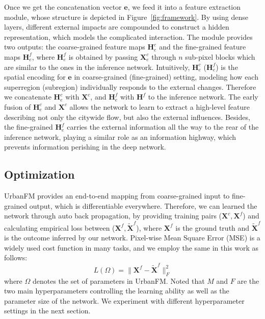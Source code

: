 Once we get the concatenation vector $\mathbf{e}$, we feed it into a feature extraction module, whose structure is depicted in Figure~\ref{fig:framework}. By using dense layers, different external impacts are compounded to construct a hidden representation, which models the complicated interaction. The module provides two outputs: the coarse-grained feature maps $\mathbf{H}^c_e$ and the fine-grained feature maps $\mathbf{H}^f_e$, where $\mathbf{H}^f_e$ is obtained by passing $\mathbf{X}^c_e$ through $n$ sub-pixel blocks which are similar to the ones in the inference network. Intuitively, $\mathbf{H}^c_e$ ($\mathbf{H}^f_e$) is the spatial encoding for $\mathbf{e}$ in coarse-grained (fine-grained) setting, modeling how each superregion (subregion) individually responds to the external changes. Therefore we concatenate $\mathbf{H}^c_e$ with $\mathbf{X}^c$, and $\mathbf{H}^f_e$ with $\mathbf{H}^f$ to the inference network. The early fusion of $\mathbf{H}^c_e$ and $\mathbf{X}^c$ allows the network to learn to extract a high-level feature describing not only the citywide flow, but also the external influences. Besides, the fine-grained $\mathbf{H}^f_e$ carries the external information all the way to the rear of the inference network, playing a similar role as an information highway, which prevents information perishing in the deep network.

\subsection{Optimization}
UrbanFM provides an end-to-end mapping from coarse-grained input to fine-grained output, which is differentiable everywhere. Therefore, we can learned the network through auto back propagation, by providing training pairs ($\mathbf{X}^c, \mathbf{X}^f$) and calculating empirical loss between ($\mathbf{X}^f,\tilde{\mathbf{X}}^f$), where $\mathbf{X}^f$ is the ground truth and $\tilde{\mathbf{X}}^f$ is the outcome inferred by our network. Pixel-wise Mean Square Error (MSE) is a widely used cost function in many tasks, and we employ the same in this work as follows:
\begin{equation}
L(\Omega)=\lVert{\mathbf{X}^f-\tilde{\mathbf{X}}^f}\rVert_F^2
\end{equation}
where $\Omega$ denotes the set of parameters in UrbanFM. Noted that $M$ and $F$ are the two main hyperparameters controlling the learning ability as well as the parameter size of the network. We experiment with different hyperparameter settings in the next section.



